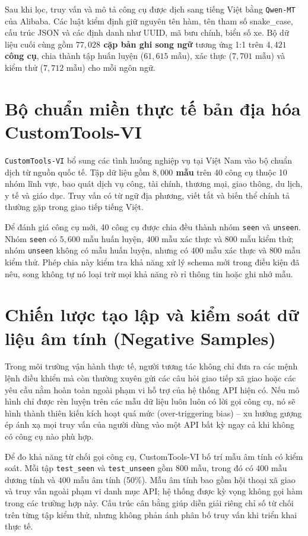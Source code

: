 Sau khi lọc, truy vấn và mô tả công cụ được dịch sang tiếng Việt bằng \texttt{Qwen-MT} của Alibaba. Các luật kiểm định giữ nguyên tên hàm, tên tham số snake\_case, cấu trúc JSON và các định danh như UUID, mã bưu chính, biển số xe. Bộ dữ liệu cuối cùng gồm \textbf{$77{,}028$ cặp bản ghi song ngữ} tương ứng 1:1 trên \textbf{$4{,}421$ công cụ}, chia thành tập huấn luyện ($61{,}615$ mẫu), xác thực ($7{,}701$ mẫu) và kiểm thử ($7{,}712$ mẫu) cho mỗi ngôn ngữ.

\section{Bộ chuẩn miền thực tế bản địa hóa CustomTools-VI}
\texttt{CustomTools-VI} bổ sung các tình huống nghiệp vụ tại Việt Nam vào bộ chuẩn dịch từ nguồn quốc tế. Tập dữ liệu gồm \textbf{$8{,}000$ mẫu} trên 40 công cụ thuộc 10 nhóm lĩnh vực, bao quát dịch vụ công, tài chính, thương mại, giao thông, du lịch, y tế và giáo dục. Truy vấn có từ ngữ địa phương, viết tắt và biến thể chính tả thường gặp trong giao tiếp tiếng Việt.

Để đánh giá công cụ mới, 40 công cụ được chia đều thành nhóm \texttt{seen} và \texttt{unseen}. Nhóm \texttt{seen} có $5{,}600$ mẫu huấn luyện, $400$ mẫu xác thực và $800$ mẫu kiểm thử; nhóm \texttt{unseen} không có mẫu huấn luyện, nhưng có $400$ mẫu xác thực và $800$ mẫu kiểm thử. Phép chia này kiểm tra khả năng xử lý schema mới trong điều kiện đã nêu, song không tự nó loại trừ mọi khả năng rò rỉ thông tin hoặc ghi nhớ mẫu.

\section{Chiến lược tạo lập và kiểm soát dữ liệu âm tính (Negative Samples)}
Trong môi trường vận hành thực tế, người tương tác không chỉ đưa ra các mệnh lệnh điều khiển mà còn thường xuyên gửi các câu hỏi giao tiếp xã giao hoặc các yêu cầu nằm hoàn toàn ngoài phạm vi hỗ trợ của hệ thống API hiện có. Nếu mô hình chỉ được rèn luyện trên các mẫu dữ liệu luôn luôn có lời gọi công cụ, nó sẽ hình thành thiên kiến kích hoạt quá mức (over-triggering bias) – xu hướng gượng ép ánh xạ mọi truy vấn của người dùng vào một API bất kỳ ngay cả khi không có công cụ nào phù hợp.

Để đo khả năng từ chối gọi công cụ, CustomTools-VI bố trí mẫu âm tính có kiểm soát. Mỗi tập \texttt{test_seen} và \texttt{test_unseen} gồm $800$ mẫu, trong đó có $400$ mẫu dương tính và $400$ mẫu âm tính (50\%). Mẫu âm tính bao gồm hội thoại xã giao và truy vấn ngoài phạm vi danh mục API; hệ thống được kỳ vọng không gọi hàm trong các trường hợp này. Cấu trúc cân bằng giúp diễn giải riêng chỉ số từ chối trên từng tập kiểm thử, nhưng không phản ánh phân bố truy vấn khi triển khai thực tế.

